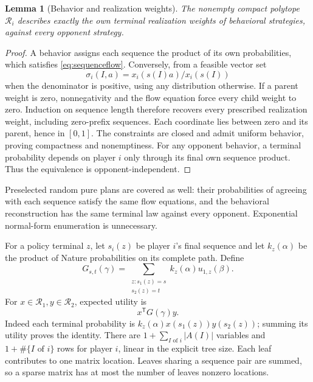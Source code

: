 \documentclass[11pt,a4paper]{article}
\numberwithin{equation}{section}
\newtheorem{lemma}[theorem]{Lemma}
\theoremstyle{definition}
\begin{document}
\begin{lemma}[Behavior and realization weights]\label{lem:sequence}
The nonempty compact polytope \(\mathcal R_i\) describes exactly
the own terminal realization weights of behavioral strategies,
against every opponent strategy.
\end{lemma}
\begin{proof}
A behavior assigns each sequence the product of its own probabilities,
which satisfies \eqref{eq:sequenceflow}. Conversely, from a feasible
vector set
\[
 \sigma_i(I,a)=x_i(s(I)a)/x_i(s(I))
\]
when the denominator is positive, using any distribution otherwise.
If a parent weight is zero, nonnegativity and the flow equation force
every child weight to zero. Induction on sequence length therefore
recovers every prescribed realization weight, including zero-prefix
sequences. Each coordinate lies between zero and its parent, hence
in \([0,1]\). The constraints are closed and admit uniform behavior,
proving compactness and nonemptiness.
For any opponent behavior, a terminal probability depends on player
\(i\) only through its final own sequence product.
Thus the equivalence is opponent-independent.
\end{proof}

Preselected random pure plans are covered as well: their probabilities
of agreeing with each sequence satisfy the same flow equations, and
the behavioral reconstruction has the same terminal law against every
opponent. Exponential normal-form enumeration is unnecessary.

For a policy terminal \(z\), let \(s_i(z)\) be player \(i\)'s final
sequence and let \(k_z(\alpha)\) be the product of Nature probabilities
on its complete path. Define
\begin{equation}\label{eq:sequencematrix}
 G_{s,t}(\gamma)=
    \sum_{\substack{z:s_1(z)=s\\s_2(z)=t}}
                   k_z(\alpha)u_{1,z}(\beta).
\end{equation}
For \(x\in\mathcal R_1,y\in\mathcal R_2\), expected utility is
\begin{equation}\label{eq:sequencepayoff}
 x^{\mathsf T}G(\gamma)y .
\end{equation}
Indeed each terminal probability is
\(k_z(\alpha)x(s_1(z))y(s_2(z))\); summing its utility proves
the identity. There are \(1+\sum_{I\text{ of }i}|A(I)|\) variables
and \(1+\#\{I\text{ of }i\}\) rows for player \(i\), linear in the
explicit tree size. Each leaf contributes to one matrix location.
Leaves sharing a sequence pair are summed, so a sparse matrix has
at most the number of leaves nonzero locations.
\end{document}
